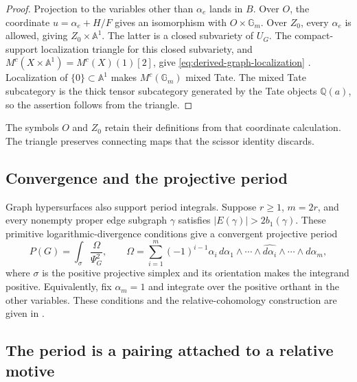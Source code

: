 \documentclass[11pt]{article}
\theoremstyle{definition}
\theoremstyle{remark}
\newcommand{\Q}{\mathbb Q}
\newcommand{\A}{\mathbb A}
\begin{document}
\begin{proof}
Projection to the variables other than $\alpha_e$ lands in $B$. Over
$O$, the coordinate $u=\alpha_e+H/F$ gives an isomorphism with
$O\times\mathbb G_m$. Over $Z_0$, every $\alpha_e$ is allowed, giving
$Z_0\times\A^1$. The latter is a closed subvariety of $U_G$.
The compact-support localization triangle for this closed subvariety,
and $M^c(X\times\A^1)=M^c(X)(1)[2]$, give
\eqref{eq:derived-graph-localization}
\cite[Propositions 4.1.5--4.1.7, Corollary 4.1.8]{dagVoevodsky2000}.
Localization of $\{0\}\subset\A^1$ makes $M^c(\mathbb G_m)$ mixed Tate.
The mixed Tate subcategory is the thick tensor subcategory generated by
the Tate objects $\Q(a)$, so the assertion follows from the triangle.
\end{proof}

The symbols $O$ and $Z_0$ retain their definitions from that coordinate calculation. The triangle preserves connecting maps that the scissor identity discards.

\subsection{Convergence and the projective period}

Graph hypersurfaces also support period integrals. Suppose $r\ge1$, $m=2r$, and every nonempty proper edge subgraph $\gamma$ satisfies $|E(\gamma)|>2b_1(\gamma)$. These primitive logarithmic-divergence conditions give a convergent projective period
\[
  P(G)=\int_{\sigma}\frac{\Omega}{\Psi_G^2},\qquad
  \Omega=\sum_{i=1}^{m}(-1)^{i-1}\alpha_i\,
     d\alpha_1\wedge\cdots\wedge\widehat{d\alpha_i}
     \wedge\cdots\wedge d\alpha_m,
\]
where $\sigma$ is the positive projective simplex and its orientation
makes the integrand positive.  Equivalently, fix $\alpha_m=1$ and
integrate over the positive orthant in the other variables.  These
conditions and the relative-cohomology construction are given in
\cite[\S5, \S7]{BEKGraphPolynomials}.

\subsection{The period is a pairing attached to a relative motive}
\label{sec:derived-relative-period}
\end{document}
